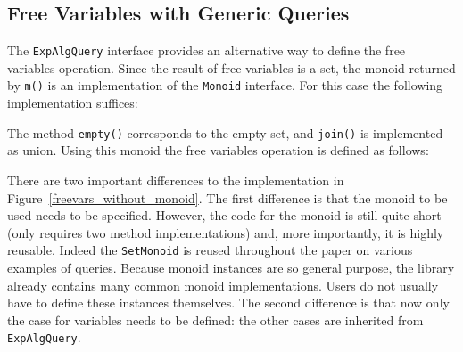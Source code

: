 \subsection{Free Variables with Generic Queries}\label{subsec:solvingfreevars}


The \lstinline{ExpAlgQuery} interface provides an alternative way to
define the free variables operation.  Since the result of free
variables is a set, the monoid returned by \lstinline{m()} is an
implementation of the \lstinline{Monoid} interface. For this case the following implementation suffices:


\noindent The method
\lstinline{empty()} corresponds to the empty set, and
\lstinline{join()} is implemented as union.  Using this monoid the
free variables operation is defined as follows:



\noindent There are two important differences to the implementation in
Figure~\ref{freevars_without_monoid}. The first difference is that the monoid to be used
needs to be specified. However, the code for the monoid is still
quite short (only requires two method implementations) and, more importantly,
it is highly reusable. Indeed the \lstinline{SetMonoid} is reused
throughout the paper on various examples of queries.
Because monoid instances are so general purpose, the \name library
already contains many common monoid implementations. Users do not
usually have to
define these instances themselves.
The second difference is that now only the case for variables needs to
be defined: the other cases are inherited from
\lstinline{ExpAlgQuery}.

